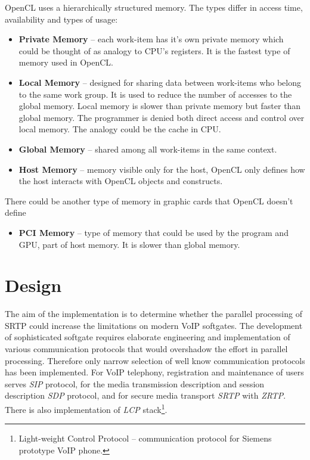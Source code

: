 OpenCL uses a hierarchically structured memory. The types differ in access time,
availability and types of usage\cite{opencl}:
\begin{itemize}
\item \textbf{Private Memory} -- each work-item has it's own private memory 
which could be thought of as analogy to CPU's registers. It is the fastest type 
of memory used in OpenCL.
\item \textbf{Local Memory} -- designed for sharing data between work-items who 
belong to the same work group. It is used to reduce the number of accesses to 
the global memory. Local memory is slower than private memory but faster than 
global memory. The programmer is denied both direct access and control over 
local memory. The analogy could be the cache in CPU.
\item \textbf{Global Memory} -- shared among all work-items in the same context.
\item \textbf{Host Memory} -- memory visible only for the host, OpenCL only 
defines how the host interacts with OpenCL objects and constructs.
\end{itemize}

\hspace{-1.5em}
There could be another type of memory in graphic cards that OpenCL doesn't 
define

\begin{itemize}
\item \textbf{PCI Memory} -- type of memory that could be used by the program 
and GPU, part of host memory. It is slower than global memory.
\end{itemize}



\chapter{Design}\label{chapter:design}%
The aim of the implementation is to determine whether the parallel processing
of SRTP could increase the limitations on modern VoIP softgates. The development
of sophisticated softgate requires elaborate engineering and implementation
of various communication protocols that would overshadow the effort in parallel
processing. Therefore only narrow selection of well know communication protocols
has been implemented. For VoIP telephony, registration and maintenance of users
serves \textit{SIP} protocol, for the media transmission description
and session description \textit{SDP} protocol, and for secure media transport 
\textit{SRTP} with \textit{ZRTP}. There is also implementation of \textit{LCP} 
stack\footnote{ Light-weight Control Protocol -- communication protocol for
Siemens prototype VoIP phone.}.


